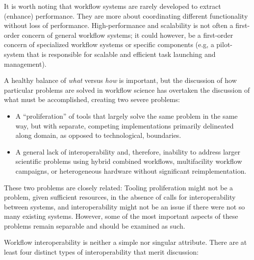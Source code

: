 It is worth noting that workflow systems are rarely developed to extract
(enhance) performance. They are more about coordinating different
functionality without loss of performance. High-performance and scalability is
not often a first-order concern of general workflow systems; it could however,
be a first-order concern of specialized workflow systems or specific
components (e.g, a pilot-system that is responsible for scalable and efficient
task launching and management).

A healthy balance of \textit{what} versus \textit{how} is
important, but the discussion of how particular problems are
solved in workflow science has overtaken the discussion of what must be
accomplished, creating two severe problems: 
\begin{itemize} 
  \item A ``proliferation'' of tools that largely solve the same problem in the
  same way, but with separate, competing implementations primarily delineated
  along domain, as opposed to technological, boundaries.  
  \item A general lack of interoperability and, therefore, inability to address
  larger scientific problems using hybrid combined workflows, multifacility
  workflow campaigns, or heterogeneous hardware without significant
  reimplementation.
\end{itemize}

These two problems are closely related: Tooling proliferation might not be a
problem, given sufficient resources, in the absence of calls for
interoperability between systems, and interoperability might not be an issue if
there were not so many existing systems. However, some of the most important
aspects of these problems remain separable and should be examined as such.

Workflow interoperability is neither a simple nor singular attribute. There
are at least four distinct types of interoperability that merit discussion:


